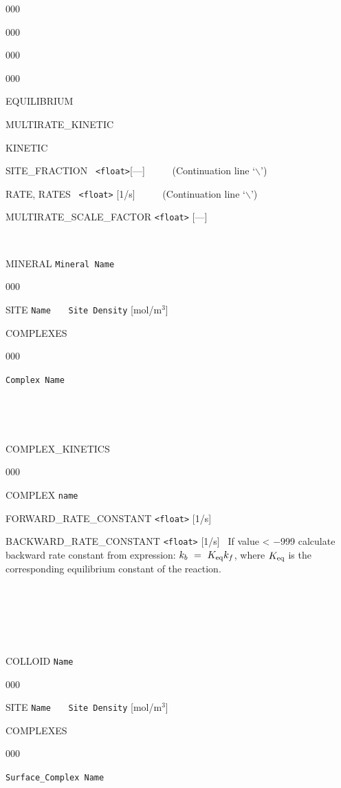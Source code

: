 \begin{deflist}{000}
\begin{deflist}{000}
\begin{deflist}{000}
\begin{deflist}{000}
\item[EQUILIBRIUM]

\item[MULTIRATE\_KINETIC]

\item[KINETIC]


\item [SITE\_FRACTION] \ {\tt <float>}[---] \ \ \ \ \ (Continuation line `$\backslash$')
\item [RATE, RATES] \ {\tt <float>} [1/s] \ \ \ \ \ (Continuation line `$\backslash$')
\item [MULTIRATE\_SCALE\_FACTOR] {\tt <float>} [---]

~\\

\item [MINERAL] {\tt Mineral Name}
\begin{deflist}{000}
\item[SITE] {\tt Name} \ \ \ {\tt Site Density} [mol/m$^3$]
\item[COMPLEXES] ~
\begin{deflist}{000}
\item[\tt Complex Name]
\end{deflist}
\item [\keyend] ~

~\\

\item[COMPLEX\_KINETICS] ~
\begin{deflist}{000}
\item[COMPLEX] {\tt name}
\item[FORWARD\_RATE\_CONSTANT] {\tt <float>} [1/s]
\item[BACKWARD\_RATE\_CONSTANT] {\tt <float>} [1/s] \ If value < $-$999 calculate backward rate constant from expression: $k_b \ =\  K_{\rm eq} k_f$, where $K_{\rm eq}$ is the corresponding equilibrium constant of the reaction.
\end{deflist}
\item [\keyend] ~
\end{deflist}
\item [\keyend] ~

~\\

\item [COLLOID] {\tt Name}
\begin{deflist}{000}
\item[SITE] {\tt Name} \ \ \ {\tt Site Density} [mol/m$^3$]
\item[COMPLEXES] ~
\begin{deflist}{000}
\item[\tt Surface\_Complex Name]
\end{deflist}
\item [\keyend] ~
\end{deflist}
\item [\keyend] ~
\end{deflist}


\end{deflist}
\end{deflist}
\end{deflist}
